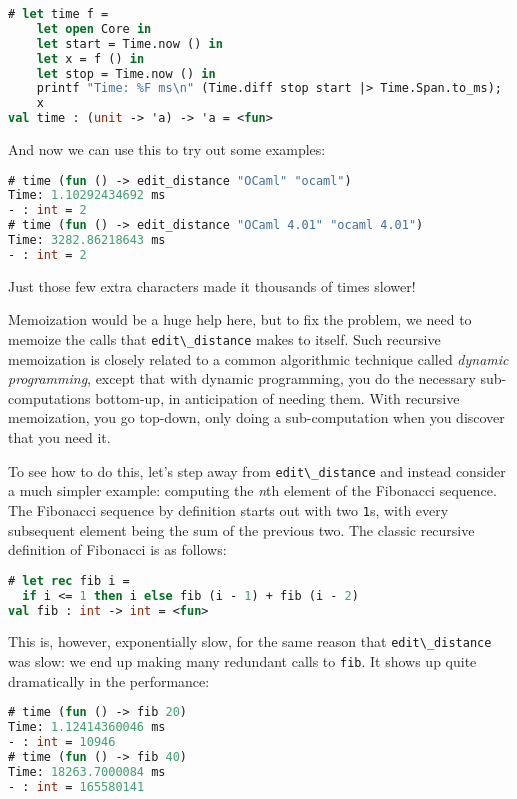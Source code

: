 \begin{lstlisting}[language=Caml]
# let time f =
    let open Core in
    let start = Time.now () in
    let x = f () in
    let stop = Time.now () in
    printf "Time: %F ms\n" (Time.diff stop start |> Time.Span.to_ms);
    x
val time : (unit -> 'a) -> 'a = <fun>
\end{lstlisting}

And now we can use this to try out some examples:

\begin{lstlisting}[language=Caml]
# time (fun () -> edit_distance "OCaml" "ocaml")
Time: 1.10292434692 ms
- : int = 2
# time (fun () -> edit_distance "OCaml 4.01" "ocaml 4.01")
Time: 3282.86218643 ms
- : int = 2
\end{lstlisting}

Just those few extra characters made it thousands of times slower!

Memoization would be a huge help here, but to fix the problem, we need
to memoize the calls that \passthrough{\lstinline!edit\_distance!} makes
to itself. Such recursive memoization is closely related to a common
algorithmic technique called \emph{dynamic programming}, except that
with dynamic programming, you do the necessary sub-computations
bottom-up, in anticipation of needing them. With recursive memoization,
you go top-down, only doing a sub-computation when you discover that you
need it. 

To see how to do this, let's step away from
\passthrough{\lstinline!edit\_distance!} and instead consider a much
simpler example: computing the \emph{n}th element of the Fibonacci
sequence. The Fibonacci sequence by definition starts out with two
\passthrough{\lstinline!1!}s, with every subsequent element being the
sum of the previous two. The classic recursive definition of Fibonacci
is as follows:

\begin{lstlisting}[language=Caml]
# let rec fib i =
  if i <= 1 then i else fib (i - 1) + fib (i - 2)
val fib : int -> int = <fun>
\end{lstlisting}

This is, however, exponentially slow, for the same reason that
\passthrough{\lstinline!edit\_distance!} was slow: we end up making many
redundant calls to \passthrough{\lstinline!fib!}. It shows up quite
dramatically in the performance:

\begin{lstlisting}[language=Caml]
# time (fun () -> fib 20)
Time: 1.12414360046 ms
- : int = 10946
# time (fun () -> fib 40)
Time: 18263.7000084 ms
- : int = 165580141
\end{lstlisting}

